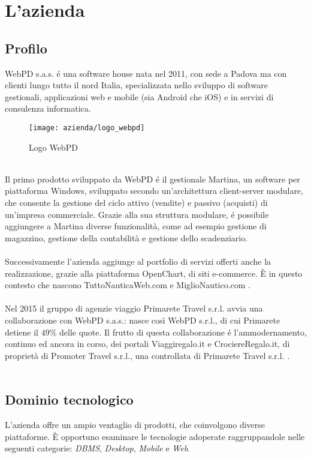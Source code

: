 
\chapter{L'azienda}
\label{cap:processi-metodologie}

\section{Profilo}
WebPD s.a.s. é una software house nata nel 2011, con sede a Padova ma con clienti lungo tutto il nord Italia, specializzata nello sviluppo di software gestionali, applicazioni web e mobile (sia Android che iOS) e in servizi di consulenza informatica.\\
\begin{figure}[!h] 
	\centering 
	\texttt{[image: azienda/logo\_webpd]} 
	\caption{Logo WebPD}
\end{figure}
\\
Il primo prodotto sviluppato da WebPD é il gestionale Martina, un software per piattaforma Windows, sviluppato secondo un'architettura client-server modulare, che consente la gestione del ciclo attivo (vendite) e passivo (acquisti) di un'impresa commerciale. Grazie alla sua struttura modulare, é possibile aggiungere a Martina diverse funzionalità, come ad esempio gestione di magazzino, gestione della contabilità e gestione dello scadenziario.\\\\
Successivamente l'azienda aggiunge al portfolio di servizi offerti anche la realizzazione, grazie alla piattaforma OpenChart, di siti e-commerce. È in questo contesto che nascono TuttoNauticaWeb.com e MiglioNautico.com .\\\\
Nel 2015 il gruppo di agenzie viaggio Primarete Travel s.r.l. avvia una collaborazione con WebPD s.a.s.: nasce così WebPD s.r.l., di cui Primarete detiene il 49\% delle quote. Il frutto di questa collaborazione é l'ammodernamento, continuo ed ancora in corso, dei portali Viaggiregalo.it e  CrociereRegalo.it, di proprietà di Promoter Travel s.r.l., una controllata di Primarete Travel s.r.l. .\\\\

\section{Dominio tecnologico}
L'azienda offre un ampio ventaglio di prodotti, che coinvolgono diverse piattaforme. È opportuno esaminare le tecnologie adoperate raggruppandole nelle seguenti categorie: \textit{DBMS}, \textit{Desktop}, \textit{Mobile} e \textit{Web}.

